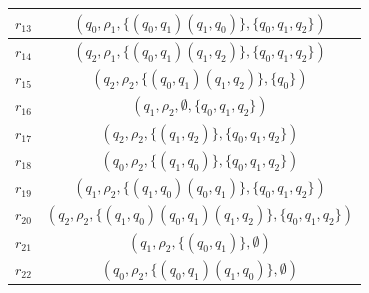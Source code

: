 {\begin{table}[t]
\begin{tabular}{|c|c|}
                        \hline
                        $r_{13}$ & $(q_0, \rho_1, \{ (q_0, q_1) (q_1, q_0) \}, \{ q_0, q_1, q_2 \})$\\
                        \hline
                        $r_{14}$ & $(q_2, \rho_1, \{ (q_0, q_1) (q_1, q_2) \}, \{ q_0, q_1, q_2 \})$\\
                        \hline
                        $r_{15}$ & $(q_2, \rho_2, \{ (q_0, q_1) (q_1, q_2) \}, \{ q_0 \})$\\
                        \hline
                        $r_{16}$ & $(q_1, \rho_2, \emptyset, \{ q_0, q_1, q_2 \})$\\
                        \hline
                        $r_{17}$ & $(q_2, \rho_2, \{ (q_1, q_2) \}, \{ q_0, q_1, q_2 \})$\\
                        \hline
                        $r_{18}$ & $(q_0, \rho_2, \{ (q_1, q_0) \}, \{ q_0, q_1, q_2 \})$\\
                        \hline
                        $r_{19}$ & $(q_1, \rho_2, \{ (q_1, q_0) (q_0, q_1) \}, \{ q_0, q_1, q_2 \})$\\
                        \hline
                        $r_{20}$ & $(q_2, \rho_2, \{ (q_1, q_0) (q_0, q_1) (q_1, q_2) \}, \{ q_0, q_1, q_2 \})$\\
                        \hline
                        $r_{21}$ & $(q_1, \rho_2, \{ (q_0, q_1) \}, \emptyset)$\\
                        \hline
                        $r_{22}$ & $(q_0, \rho_2, \{ (q_0, q_1) (q_1, q_0) \}, \emptyset)$\\
                        \hline
                    \end{tabular}
                \end{table}
                }


